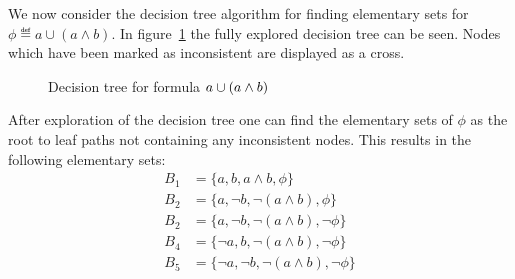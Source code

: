 \begin{example}
We now consider the decision tree algorithm for finding elementary sets for $\phi \eqdef a \cup (a \land b)$. In figure~\ref{fig:elemset} the fully explored decision tree can be seen. Nodes which have been marked as inconsistent are displayed as a cross.
\begin{figure}[!ht]
\begin{center}
    
    \caption{Decision tree for formula $a \cup (a \land b)$}
    \label{fig:elemset}
\end{center}
\end{figure}
After exploration of the decision tree one can find the elementary sets of $\phi$ as the root to leaf paths not containing any inconsistent nodes. This results in the following elementary sets:
\begin{align*}
    B_1 &= \{a,         b,         a\land b,           \phi\} \\
    B_2 &= \{a,         \lnot b,    \lnot (a\land b),   \phi\} \\
    B_2 &= \{a,         \lnot b,    \lnot (a\land b),   \lnot \phi\} \\
    B_4 &= \{\lnot a,   b,         \lnot (a\land b),  \lnot \phi\} \\
    B_5 &= \{\lnot a,   \lnot b,    \lnot (a\land b),   \lnot \phi\} \\
\end{align*}
\end{example}

